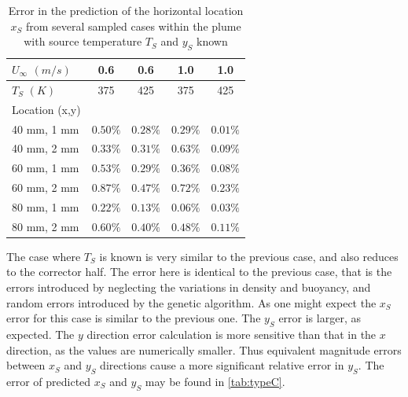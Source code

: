 \documentclass[preprint,12pt]{elsarticle}
\begin{document}
\begin{table}[!h!t!b!p]
\begin{center}
\begin{tabular}{ l | c c c c}
 $U_{\infty}$ $(m/s)$ & 0.6 & 0.6 & 1.0 & 1.0 \\ \hline
 $T_S$ $(K)$ & 375 & 425 & 375 & 425  \\ \hline \hline
 Location (x,y) & \\
 40 mm, 1 mm & $0.50\%$ & $0.28\%$ & $0.29\%$ & $0.01\%$ \\ \hline
 40 mm, 2 mm & $0.33\%$ & $0.31\%$ & $0.63\%$ & $0.09\%$ \\ \hline
 60 mm, 1 mm & $0.53\%$ & $0.29\%$ & $0.36\%$ & $0.08\%$ \\ \hline
 60 mm, 2 mm & $0.87\%$ & $0.47\%$ & $0.72\%$ & $0.23\%$ \\ \hline
 80 mm, 1 mm & $0.22\%$ & $0.13\%$ & $0.06\%$ & $0.03\%$ \\ \hline
 80 mm, 2 mm & $0.60\%$ & $0.40\%$ & $0.48\%$ & $0.11\%$ \\ \hline
 \end{tabular}
\caption{Error in the prediction of the horizontal location $x_S$ from several sampled cases within the plume with source temperature $T_S$ and $y_S$ known}
\label{tab:typeB}
\end{center}
\end{table}


The case where $T_S$ is known is very similar to the previous case, and also reduces to the corrector half.  The error here is identical to the previous case, that is the errors introduced by neglecting the variations in density and buoyancy, and random errors introduced by the genetic algorithm.  As one might expect the $x_S$ error for this case is similar to the previous one.  The $y_S$ error is larger, as expected.  The $y$ direction error calculation is more sensitive than that in the $x$ direction, as the values are numerically smaller.  Thus equivalent magnitude errors between $x_S$ and $y_S$ directions cause a more significant relative error in $y_S$.  The error of predicted $x_S$ and $y_S$ may be found in \cref{tab:typeC}.
\end{document}
